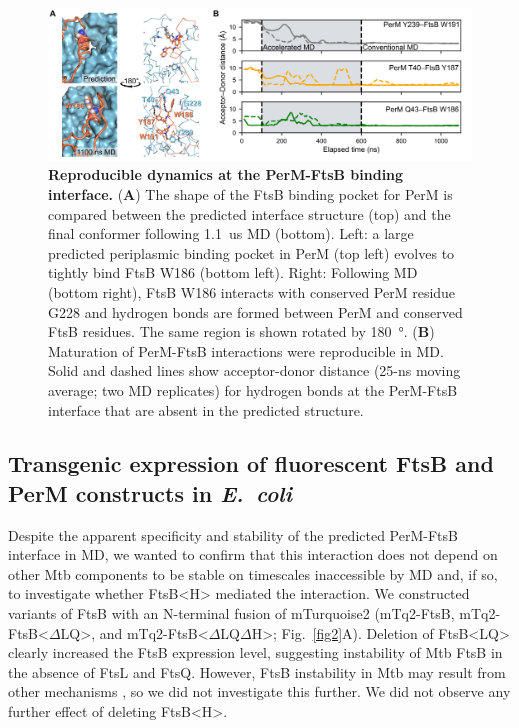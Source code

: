 \documentclass[twocolumn,pdflatex,sn-nature]{sn-jnl}%
\def\textsuperscript#1{<#1>}%
\newcommand\ec{\textit{E.~coli}}
\newcommand\mtb{Mtb}
\newcommand\ftsbLQ{FtsB\textsuperscript{LQ}}
\newcommand\ftsbH{FtsB\textsuperscript{H}}
\newcommand\ftsbdLQ{FtsB\textsuperscript{$\Delta{}$LQ}}
\newcommand\ftsbdLQdH{FtsB\textsuperscript{$\Delta{}$LQ$\Delta{}$H}}
\begin{document}
\begin{figure}[htb]
    \centering
    \includegraphics[width=1.0\textwidth]{../figures/fig1_2.png}
    \caption{
        \textbf{Reproducible dynamics at the PerM-FtsB binding interface.}
        (\textbf{A}) The shape of the FtsB binding pocket for PerM is compared between the predicted interface structure (top) and the final conformer following \qty{1.1}{us} MD (bottom). Left: a large predicted periplasmic binding pocket in PerM (top left) evolves to tightly bind FtsB W186 (bottom left). Right: Following MD (bottom right), FtsB W186 interacts with conserved PerM residue G228 and hydrogen bonds are formed between PerM and conserved FtsB residues. The same region is shown rotated by \qty{180}{\degree}.
        (\textbf{B}) Maturation of PerM-FtsB interactions were reproducible in MD. Solid and dashed lines show acceptor-donor distance (25-ns moving average; two MD replicates) for hydrogen bonds at the PerM-FtsB interface that are absent in the predicted structure.
    }\label{fig1_2}
\end{figure}

\subsection{Transgenic expression of fluorescent FtsB and PerM constructs in \ec{}}

Despite the apparent specificity and stability of the predicted PerM-FtsB interface in MD, we wanted to confirm that this interaction does not depend on other \mtb{} components to be stable on timescales inaccessible by MD and, if so, to investigate whether \ftsbH{} mediated the interaction.
We constructed variants of FtsB with an N-terminal fusion of mTurquoise2 (mTq2-FtsB, mTq2-\ftsbdLQ{}, and mTq2-\ftsbdLQdH{}; Fig.~\ref{fig2}A). Deletion of \ftsbLQ{} clearly increased the FtsB expression level, suggesting instability of \mtb{} FtsB in the absence of FtsL and FtsQ.
However, FtsB instability in \mtb{} may result from other mechanisms \citep{wangPersistentMycobacteriumTuberculosis2019}, so we did not investigate this further.
We did not observe any further effect of deleting \ftsbH{}.
\end{document}
